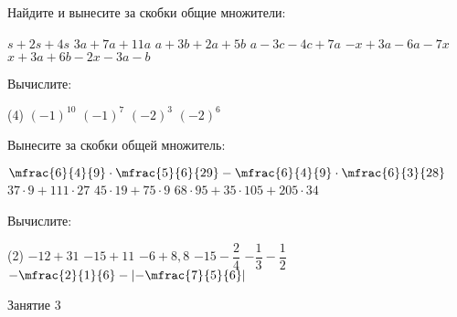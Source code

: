 \begin{homework}[number=1]
	\begin{listofex}
		\item Найдите и вынесите за скобки общие множители: %
		\begin{tasks}
			\task \( s+2s+4s \)
			\task \( 3a+7a+11a \)
			\task \( a+3b+2a+5b \)
			\task \( a-3c-4c+7a \)
			\task \( -x+3a-6a-7x \)
			\task \( x+3a+6b-2x-3a-b \)
		\end{tasks}
		\item Вычислите:
		\begin{tasks}(4)
			\task \( (-1)^{10} \)
			\task \( (-1)^7 \)
			\task \( (-2)^3 \)
			\task \( (-2)^6 \)
		\end{tasks}
		\item Вынесите за скобки общей множитель: %
		\begin{tasks}
			\task \( \mfrac{ 6 }{4  }{ 9 } \cdot \mfrac{ 5 }{ 6 }{ 29 }-\mfrac{ 6 }{4  }{ 9 } \cdot \mfrac{ 6 }{ 3 }{ 28 } \)
			\task \(37 \cdot 9+111\cdot27 \)
			\task \( 45 \cdot 19 + 75 \cdot9 \)
			\task \( 68 \cdot 95 + 35 \cdot 105 + 205 \cdot 34 \)
			
		\end{tasks}
		\item Вычислите:
		\begin{tasks}(2)
			\task \( -12 + 31 \)
			\task \( -15+11 \)
			\task \( -6+8,8 \)
			\task \( -15-\dfrac{2}{4} \)
			\task \( -\dfrac{1}{3}-\dfrac{1}{2} \)
			\task \( -\mfrac{2}{1}{6}-\left|-\mfrac{7}{5}{6}\right| \)
		\end{tasks}
	\end{listofex}
\end{homework}

\begin{class}[number=3]
	\begin{listofex}
		\item Занятие 3 
	\end{listofex}
\end{class}


